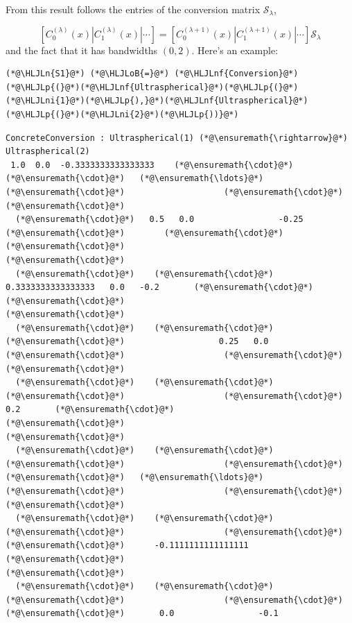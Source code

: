 \documentclass[12pt,a4paper]{article}
\newcommand{\HLJLn}[1]{#1}
\newcommand{\HLJLnf}[1]{\textcolor[RGB]{66,102,213}{#1}}
\newcommand{\HLJLni}[1]{\textcolor[RGB]{59,151,46}{#1}}
\newcommand{\HLJLoB}[1]{\textcolor[RGB]{102,102,102}{\textbf{#1}}}
\newcommand{\HLJLp}[1]{#1}
\begin{document}
From this result follows the entries of the conversion matrix $\mathcal{S}_{\lambda}$,

\[
\left[ C^{(\lambda)}_0(x) | C^{(\lambda)}_1(x) | \cdots  \right] = \left[ C^{(\lambda+1)}_0(x) | C^{(\lambda+1)}_1(x) | \cdots  \right]\mathcal{S}_{\lambda}
\]
and the fact that it has bandwidths $(0,2)$. Here's an example:


\begin{lstlisting}
(*@\HLJLn{S1}@*) (*@\HLJLoB{=}@*) (*@\HLJLnf{Conversion}@*)(*@\HLJLp{(}@*)(*@\HLJLnf{Ultraspherical}@*)(*@\HLJLp{(}@*)(*@\HLJLni{1}@*)(*@\HLJLp{),}@*)(*@\HLJLnf{Ultraspherical}@*)(*@\HLJLp{(}@*)(*@\HLJLni{2}@*)(*@\HLJLp{))}@*)
\end{lstlisting}

\begin{lstlisting}
ConcreteConversion : Ultraspherical(1) (*@\ensuremath{\rightarrow}@*) Ultraspherical(2)
 1.0  0.0  -0.3333333333333333    (*@\ensuremath{\cdot}@*)      (*@\ensuremath{\cdot}@*)   (*@\ensuremath{\ldots}@*)    (*@\ensuremath{\cdot}@*)                    (*@\ensuremath{\cdot}@*)   
(*@\ensuremath{\cdot}@*)
  (*@\ensuremath{\cdot}@*)   0.5   0.0                 -0.25    (*@\ensuremath{\cdot}@*)        (*@\ensuremath{\cdot}@*)                    (*@\ensuremath{\cdot}@*)   
(*@\ensuremath{\cdot}@*)
  (*@\ensuremath{\cdot}@*)    (*@\ensuremath{\cdot}@*)    0.3333333333333333   0.0   -0.2       (*@\ensuremath{\cdot}@*)                    (*@\ensuremath{\cdot}@*)   
(*@\ensuremath{\cdot}@*)
  (*@\ensuremath{\cdot}@*)    (*@\ensuremath{\cdot}@*)     (*@\ensuremath{\cdot}@*)                   0.25   0.0       (*@\ensuremath{\cdot}@*)                    (*@\ensuremath{\cdot}@*)   
(*@\ensuremath{\cdot}@*)
  (*@\ensuremath{\cdot}@*)    (*@\ensuremath{\cdot}@*)     (*@\ensuremath{\cdot}@*)                    (*@\ensuremath{\cdot}@*)     0.2       (*@\ensuremath{\cdot}@*)                    (*@\ensuremath{\cdot}@*)   
(*@\ensuremath{\cdot}@*)
  (*@\ensuremath{\cdot}@*)    (*@\ensuremath{\cdot}@*)     (*@\ensuremath{\cdot}@*)                    (*@\ensuremath{\cdot}@*)      (*@\ensuremath{\cdot}@*)   (*@\ensuremath{\ldots}@*)    (*@\ensuremath{\cdot}@*)                    (*@\ensuremath{\cdot}@*)   
(*@\ensuremath{\cdot}@*)
  (*@\ensuremath{\cdot}@*)    (*@\ensuremath{\cdot}@*)     (*@\ensuremath{\cdot}@*)                    (*@\ensuremath{\cdot}@*)      (*@\ensuremath{\cdot}@*)      -0.1111111111111111    (*@\ensuremath{\cdot}@*)   
(*@\ensuremath{\cdot}@*)
  (*@\ensuremath{\cdot}@*)    (*@\ensuremath{\cdot}@*)     (*@\ensuremath{\cdot}@*)                    (*@\ensuremath{\cdot}@*)      (*@\ensuremath{\cdot}@*)       0.0                 -0.1  

\end{lstlisting}
\end{document}
